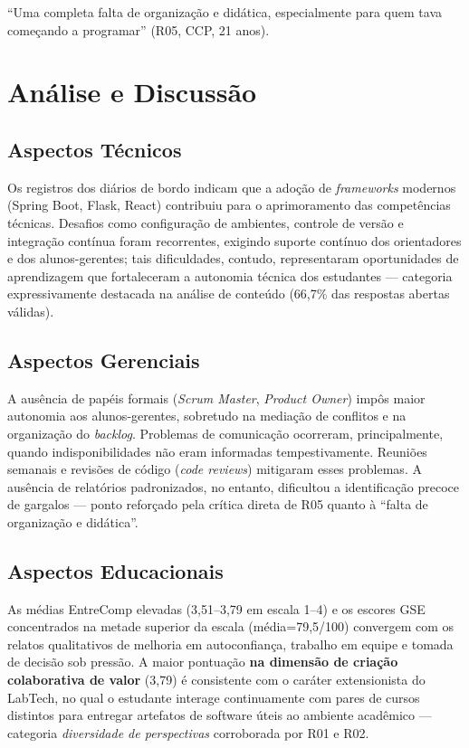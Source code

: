 \documentclass[12pt,a4paper]{article}
\renewenvironment{quote}{%
  \begin{list}{}{%
    \setlength{\leftmargin}{1.25cm}%
    \setlength{\rightmargin}{0pt}%
    \setlength{\topsep}{6pt}%
  }\item[]\small\singlespacing%
}{\end{list}}
\begin{document}
\begin{quote}\small
``Uma completa falta de organiza\c{c}\~ao e did\'atica, especialmente para
quem tava come\c{c}ando a programar'' (R05, CCP, 21 anos).
\end{quote}

\section{An\'alise e Discuss\~ao}
\label{sec:analise-discussao}

\subsection{Aspectos T\'ecnicos}
Os registros dos di\'arios de bordo indicam que a ado\c{c}\~ao de
\emph{frameworks} modernos (Spring Boot, Flask, React) contribuiu para
o aprimoramento das compet\^encias t\'ecnicas. Desafios como
configura\c{c}\~ao de ambientes, controle de vers\~ao e integra\c{c}\~ao
cont\'inua foram recorrentes, exigindo suporte cont\'inuo dos
orientadores e dos alunos-gerentes; tais dificuldades, contudo,
representaram oportunidades de aprendizagem que fortaleceram a
autonomia t\'ecnica dos estudantes --- categoria expressivamente
destacada na an\'alise de conte\'udo (66,7\% das respostas abertas
v\'alidas).

\subsection{Aspectos Gerenciais}
A aus\^encia de pap\'eis formais (\emph{Scrum Master}, \emph{Product
Owner}) imp\^os maior autonomia aos alunos-gerentes, sobretudo na
media\c{c}\~ao de conflitos e na organiza\c{c}\~ao do \emph{backlog}.
Problemas de comunica\c{c}\~ao ocorreram, principalmente, quando
indisponibilidades n\~ao eram informadas tempestivamente. Reuni\~oes
semanais e revis\~oes de c\'odigo (\emph{code reviews}) mitigaram esses
problemas. A aus\^encia de relat\'orios padronizados, no entanto,
dificultou a identifica\c{c}\~ao precoce de gargalos --- ponto refor\c{c}ado
pela cr\'itica direta de R05 quanto \`a ``falta de organiza\c{c}\~ao e
did\'atica''.

\subsection{Aspectos Educacionais}
As m\'edias EntreComp elevadas (3,51--3,79 em escala 1--4) e os escores
GSE concentrados na metade superior da escala (m\'edia=79,5/100)
convergem com os relatos qualitativos de melhoria em autoconfian\c{c}a,
trabalho em equipe e tomada de decis\~ao sob press\~ao. A maior pontua\c{c}\~ao
\textbf{na dimens\~ao de cria\c{c}\~ao colaborativa de valor} (3,79)
\'e consistente com o car\'ater extensionista do LabTech, no qual o
estudante interage continuamente com pares de cursos distintos para
entregar artefatos de software \'uteis ao ambiente acad\^emico ---
categoria \emph{diversidade de perspectivas} corroborada por R01 e R02.
\end{document}
